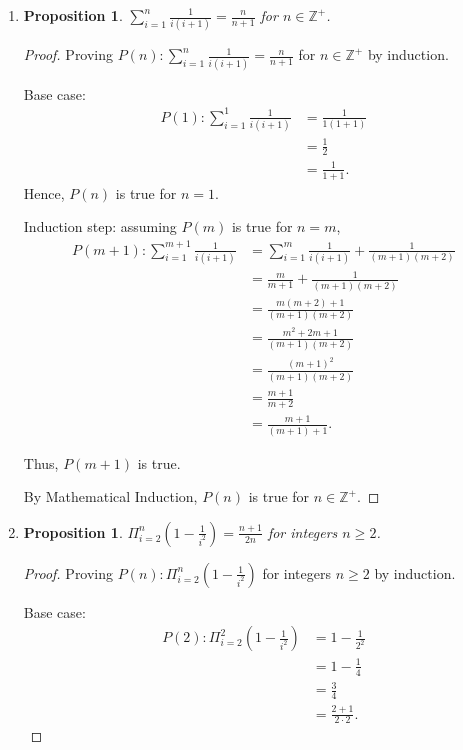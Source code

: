 \documentclass{article}
\newtheorem{prop}[thm]{Proposition}
\begin{document}
\begin{enumerate}[label={(\arabic*)}]
\item 
\begin{prop}
    $\sum_{i=1}^{n}\frac{1}{i(i+1)} =  \frac{n}{n+1}$ for $n \in \mathbb{Z}^+$.
\end{prop}
\begin{proof}
    Proving $P(n): \sum_{i=1}^{n}\frac{1}{i(i+1)} =  \frac{n}{n+1}$ for $n \in \mathbb{Z}^+$ by induction.

    Base case:
    \begin{align}
        P(1): \sum_{i=1}^{1}\frac{1}{i(i+1)} & = \frac{1}{1(1+1)} \\
        & = \frac{1}{2} \\
        & = \frac{1}{1+1}.
    \end{align}
    Hence, $P(n)$ is true for $n=1$.

    Induction step: assuming $P(m)$ is true for $n=m$,
    \begin{align}
        P(m+1): \sum_{i=1}^{m+1}\frac{1}{i(i+1)} & = \sum_{i=1}^{m}\frac{1}{i(i+1)} + \frac{1}{(m+1)(m+2)} \\
        & = \frac{m}{m+1} + \frac{1}{(m+1)(m+2)} \\
        & = \frac{m(m+2) + 1}{(m+1)(m+2)} \\ 
        & = \frac{m^2 + 2m + 1}{(m+1)(m+2)} \\
        & = \frac{(m+1)^2}{(m+1)(m+2)} \\
        & = \frac{m+1}{m+2} \\ 
        & = \frac{m+1}{(m+1)+1}.
    \end{align}

    Thus, $P(m+1)$ is true.

    By Mathematical Induction, $P(n)$ is true for $n \in \mathbb{Z}^+$.
\end{proof}

\item 
\begin{prop}
    $\Pi_{i=2}^n\left(1 - \frac{1}{i^2}\right) = \frac{n+1}{2n}$ for integers $n \ge 2$.
\end{prop}
\begin{proof}
    Proving $P(n): \Pi_{i=2}^n\left(1-\frac{1}{i^2}\right)$ for integers $n \ge 2$ by induction.

    Base case:
    \begin{align}
        P(2): \Pi_{i=2}^2\left(1-\frac{1}{i^2}\right) & = 1 - \frac{1}{2^2} \\
        & = 1 - \frac{1}{4} \\ 
        & = \frac{3}{4} \\
        & = \frac{2 + 1}{2 \cdot 2}.
    \end{align}


\end{proof}
\end{enumerate}
\end{document}
